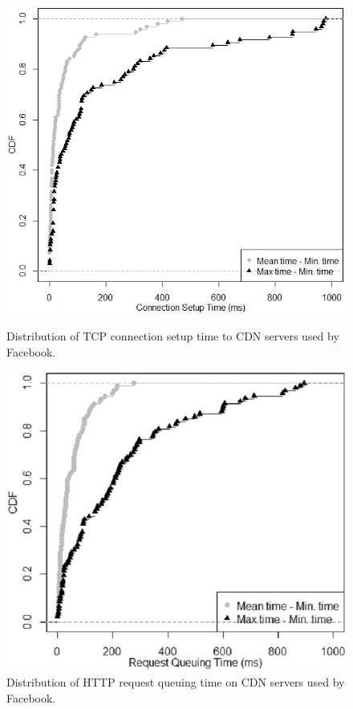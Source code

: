 \documentclass{llncs}
\begin{document}
\begin{figure}
  \includegraphics[width=\linewidth]{figures/tcp_open_facebook_local_dns}
  \caption{Distribution of TCP connection setup time to CDN servers used by Facebook.}
  \label{fig:tcp_open_facebook_local_dns}
\endminipage\hfill
{}%
  \includegraphics[width=\linewidth]{figures/server_queuing_facebook_local_dns}
  \caption{Distribution of HTTP request queuing time on CDN servers used by Facebook.}
   \label{fig:server_queuing_facebook_local_dns}
\endminipage
\end{figure}
\end{document}
